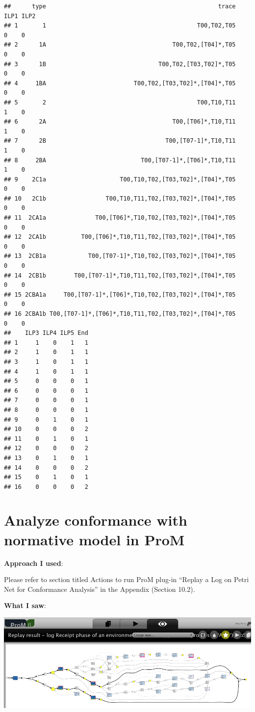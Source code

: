 \documentclass[]{article}
\begin{document}
\begin{verbatim}
##      type                                                 trace ILP1 ILP2
## 1       1                                           T00,T02,T05    0    0
## 2      1A                                    T00,T02,[T04]*,T05    0    0
## 3      1B                                T00,T02,[T03,T02]*,T05    0    0
## 4     1BA                         T00,T02,[T03,T02]*,[T04]*,T05    0    0
## 5       2                                           T00,T10,T11    1    0
## 6      2A                                    T00,[T06]*,T10,T11    1    0
## 7      2B                                  T00,[T07-1]*,T10,T11    1    0
## 8     2BA                           T00,[T07-1]*,[T06]*,T10,T11    1    0
## 9    2C1a                     T00,T10,T02,[T03,T02]*,[T04]*,T05    0    0
## 10   2C1b                 T00,T10,T11,T02,[T03,T02]*,[T04]*,T05    0    0
## 11  2CA1a              T00,[T06]*,T10,T02,[T03,T02]*,[T04]*,T05    0    0
## 12  2CA1b          T00,[T06]*,T10,T11,T02,[T03,T02]*,[T04]*,T05    0    0
## 13  2CB1a            T00,[T07-1]*,T10,T02,[T03,T02]*,[T04]*,T05    0    0
## 14  2CB1b        T00,[T07-1]*,T10,T11,T02,[T03,T02]*,[T04]*,T05    0    0
## 15 2CBA1a     T00,[T07-1]*,[T06]*,T10,T02,[T03,T02]*,[T04]*,T05    0    0
## 16 2CBA1b T00,[T07-1]*,[T06]*,T10,T11,T02,[T03,T02]*,[T04]*,T05    0    0
##    ILP3 ILP4 ILP5 End
## 1     1    0    1   1
## 2     1    0    1   1
## 3     1    0    1   1
## 4     1    0    1   1
## 5     0    0    0   1
## 6     0    0    0   1
## 7     0    0    0   1
## 8     0    0    0   1
## 9     0    1    0   1
## 10    0    0    0   2
## 11    0    1    0   1
## 12    0    0    0   2
## 13    0    1    0   1
## 14    0    0    0   2
## 15    0    1    0   1
## 16    0    0    0   2
\end{verbatim}

\section{Analyze conformance with normative model in
ProM}\label{analyze-conformance-with-normative-model-in-prom}

\textbf{Approach I used}:

Please refer to section titled Actions to run ProM plug-in ``Replay a
Log on Petri Net for Conformance Analysis'' in the Appendix (Section
10.2).

\textbf{What I saw}:

\includegraphics{CoSeLoG_Step_06_PetriNet_Normative_Conformance.png}
\end{document}
